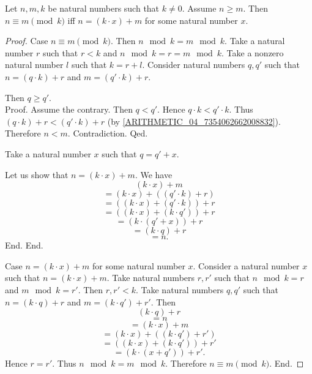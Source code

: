 \documentclass[../arithmetic.tex]{subfiles}
\begin{document}
  \begin{forthel}
    \begin{proposition}
      Let $n, m, k$ be natural numbers such that $k \neq 0$.
      Assume $n \geq m$.
      Then $n \equiv m \pmod{k}$ iff $n = (k \cdot x) + m$ for some natural
      number $x$.
    \end{proposition}
    \begin{proof}
      Case $n \equiv m \pmod{k}$.
        Then $n \mod k = m \mod k$.
        Take a natural number $r$ such that $r < k$ and
        $n \mod k = r = m \mod k$.
        Take a nonzero natural number $l$ such that $k = r + l$.
        Consider natural numbers $q,q'$ such that $n = (q \cdot k) + r$ and
        $m = (q' \cdot k) + r$.

        Then $q \geq q'$. \\
        Proof.
          Assume the contrary.
          Then $q < q'$.
          Hence $q \cdot k < q' \cdot k$.
          Thus $(q \cdot k) + r < (q' \cdot k) + r$
          (by \cref{ARITHMETIC_04_7354062662008832}).
          Therefore $n < m$.
          Contradiction.
        Qed.

        Take a natural number $x$ such that $q = q' + x$.

        Let us show that $n = (k \cdot x) + m$.
          We have
          \[  (k \cdot x) + m                       \]
          \[    = (k \cdot x) + ((q' \cdot k) + r)  \]
          \[    = ((k \cdot x) + (q' \cdot k)) + r  \]
          \[    = ((k \cdot x) + (k \cdot q')) + r  \]
          \[    = (k \cdot (q' + x)) + r            \]
          \[    = (k \cdot q) + r                   \]
          \[    = n.                                \]
        End.
      End.

      Case $n = (k \cdot x) + m$ for some natural number $x$.
        Consider a natural number $x$ such that $n = (k \cdot x) + m$.
        Take natural numbers $r, r'$ such that $n \mod k = r$ and
        $m \mod k = r'$.
        Then $r, r' < k$.
        Take natural numbers $q, q'$ such that $n = (k \cdot q) + r$ and
        $m = (k \cdot q') + r'$.
        Then
        \[  (k \cdot q) + r                         \]
        \[    = n                                   \]
        \[    = (k \cdot x) + m                     \]
        \[    = (k \cdot x) + ((k \cdot q') + r')   \]
        \[    = ((k \cdot x) + (k \cdot q')) + r'   \]
        \[    = (k \cdot (x + q')) + r'.            \]
        Hence $r = r'$.
        Thus $n \mod k = m \mod k$.
        Therefore $n \equiv m \pmod{k}$.
      End.
    \end{proof}
  \end{forthel}
\end{document}
